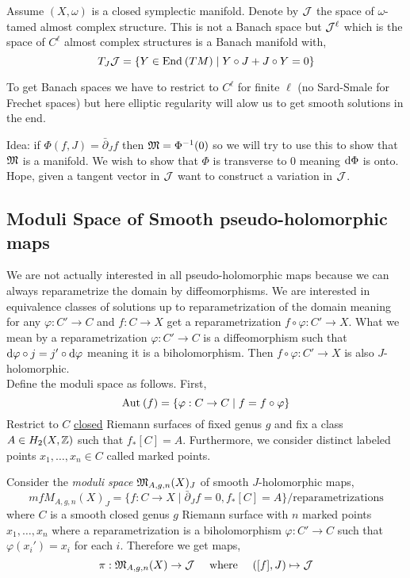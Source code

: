 \documentclass[12pt]{article}
\newcommand{\dbar}{\bar{\partial}}
\begin{document}
\begin{rmk}
Assume $(X, \omega)$ is a closed symplectic manifold. Denote by $\mathcal{J}$ the space of $\omega$-tamed almost complex structure. This is not a Banach space but $\mathcal{J}^\ell$ which is the space of $C^\ell$ almost complex structures is a Banach manifold with,
\[ T_{J} \mathcal{J} = \{ Y \in \mathrm{End}_{} \left( TM \right) \mid Y \circ J  + J \circ Y = 0 \} \]
\end{rmk}

\begin{rmk}
To get Banach spaces we have to restrict to $C^\ell$ for finite $\ell$ (no Sard-Smale for Frechet spaces) but here elliptic regularity will alow us to get smooth solutions in the end. 
\end{rmk}

Idea: if $\Phi(f, J) = \dbar_J f$ then $\mathfrak{M} = \Phi^{-1}(0)$ so we will try to use this to show that $\mathfrak{M}$ is a manifold. We wish to show that $\Phi$ is transverse to $0$ meaning $\mathrm{d}{\Phi}$ is onto. Hope, given a tangent vector in $\mathcal{J}$ want to construct a variation in $\mathcal{J}$. 

\subsection{Moduli Space of Smooth pseudo-holomorphic maps}

We are not actually interested in all pseudo-holomorphic maps because we can always reparametrize the domain by diffeomorphisms. We are interested in equivalence classes of solutions up to reparametrization of the domain meaning for any $\varphi : C' \to C$ and $f : C \to X$ get a reparametrization $f \circ \varphi : C' \to X$. What we mean by a reparametrization $\varphi : C' \to C$ is a diffeomorphism such that $\mathrm{d}{\varphi} \circ j = j' \circ \mathrm{d}{\varphi}$ meaning it is a biholomorphism. Then $f \circ \varphi : C' \to X$ is also $J$-holomorphic. 
\bigskip\\
Define the moduli space as follows. First, 
\[ \mathrm{Aut}_{} \left( f \right) = \{ \varphi : C \to C \mid f = f \circ \varphi \} \]
Restrict to $C$ \underline{closed} Riemann surfaces of fixed genus $g$ and fix a class $A \in H_2(X, \mathbb{Z})$ such that $f_* [C] = A$. Furthermore, we consider distinct labeled points $x_1, \dots, x_n \in C$ called marked points. 

\begin{defn}
Consider the \textit{moduli space} $\mathfrak{M}_{A, g, n}(X)_J$ of smooth $J$-holomorphic maps,
\[ mf{M}_{A, g, n}(X)_J = \{ f : C \to X \mid \dbar_J f = 0, f_* [C] = A \} / \text{reparametrizations} \]
where $C$ is a smooth closed genus $g$ Riemann surface with $n$ marked points $x_1, \dots, x_n$ where a reparametrization is a biholomorphism $\varphi : C' \to C$ such that $\varphi(x_i') = x_i$ for each $i$. Therefore we get maps,
\[ \pi : \mathfrak{M}_{A, g, n}(X) \to \mathcal{J} \quad \text{ where } \quad ([f], J) \mapsto \mathcal{J} \]
\end{defn}
\end{document}
